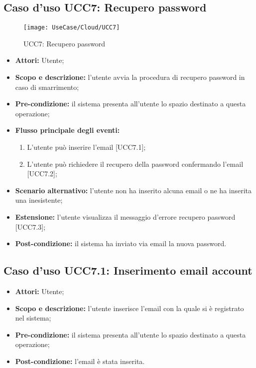\subsection{Caso d'uso UCC7: Recupero password}

\begin{figure}[H]
\centering
\texttt{[image: UseCase/Cloud/UCC7]}
\caption{UCC7: Recupero password}
\end{figure}

\begin{itemize}
\item \textbf{Attori:} Utente;
\item \textbf{Scopo e descrizione:} l'utente avvia la procedura di recupero password in caso di smarrimento;
\item \textbf{Pre-condizione:} il sistema presenta all'utente lo spazio destinato a questa operazione;
\item \textbf{Flusso principale degli eventi:}
\begin{enumerate}
\item L'utente può inserire l'email [UCC7.1];
\item L'utente può richiedere il recupero della password confermando l'email [UCC7.2];
\end{enumerate}
\item \textbf{Scenario alternativo:} l'utente non ha inserito alcuna email o ne ha inserita una inesistente;
\item \textbf{Estensione:} l'utente visualizza il messaggio d'errore recupero password [UCC7.3];
\item \textbf{Post-condizione:} il sistema ha inviato via email la nuova password.  
\end{itemize}

\subsection{Caso d'uso UCC7.1: Inserimento email account}

\begin{itemize}
\item \textbf{Attori:} Utente;
\item \textbf{Scopo e descrizione:} l'utente inserisce l'email con la quale si è registrato nel sistema;
\item \textbf{Pre-condizione:} il sistema presenta all'utente lo spazio destinato a questa operazione;
\item \textbf{Post-condizione:} l'email è stata inserita.
\end{itemize}

